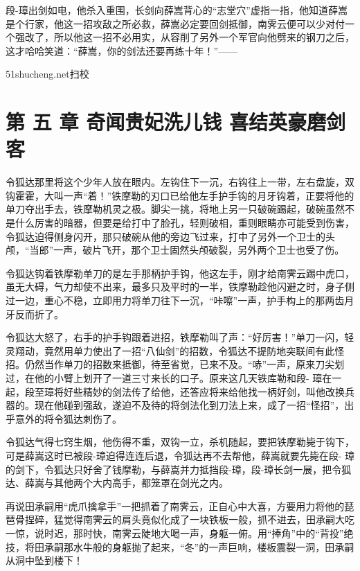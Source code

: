\documentclass[12pt,oneside]{book}
\begin{document}
段-璋出剑如电，他杀入重围，长剑向薛嵩背心的``志堂穴''虚指一指，他知道薛嵩是个行家，他这一招攻敌之所必救，薛嵩必定要回剑抵御，南霁云便可以少对付一个强改了，所以他这一招不必用实，从容削了另外一个军官向他劈来的钢刀之后，这才哈哈笑道：``薛嵩，你的剑法还要再练十年！''------

51shucheng.net扫校

\chapter{第 五 章 奇闻贵妃洗儿钱
喜结英豪磨剑客}\label{ux7b2c-ux4e94-ux7ae0-ux5947ux95fbux8d35ux5983ux6d17ux513fux94b1-ux559cux7ed3ux82f1ux8c6aux78e8ux5251ux5ba2}

令狐达那里将这个少年人放在眼内。左钩住下一沉，右钩往上一带，左右盘旋，双钩霍霍，大叫一声``着！''铁摩勒的刃口已给他左手护手钩的月牙钩着，正要将他的单刀夺出手去，铁摩勒机灵之极。脚尖一挑，将地上另一只破碗踢起，破碗虽然不是什么厉害的暗器，但要是给打中了脸孔，轻则破相，重则眼睛亦可能受到伤害，令狐达迫得侧身闪开，那只破碗从他的旁边飞过来，打中了另外一个卫士的头颅，``当郎''一声，破片飞开，那个卫士固然头颅破裂，另外两个卫士也受了伤。

令狐达钩着铁摩勒单刀的是左手那柄护手钩，他这左手，刚才给南霁云踢中虎口，虽无大碍，气力却使不出来，最多只及平时的一半，铁摩勒趁他闪避之时，身子侧过一边，重心不稳，立即用力将单刀往下一沉，``咔嚓''一声，护手构上的那两齿月牙反而折了。

令狐达大怒了，右手的护手钩跟着进招，铁摩勒叫了声：``好厉害！''单刀一闪，轻灵翔动，竟然用单力使出了一招``八仙剑''的招数，令狐达不提防地突联间有此怪招。仍然当作单刀的招数来抵御，待至省觉，已来不及。``哧''一声，原来刀尖划过，在他的小臂上划开了一道三寸来长的口子。原来这几天铁库勒和段-
璋在一起，段至璋将好些精妙的剑法传了给他，还答应将来给他找一柄好剑，叫他改换兵器的。现在他碰到强敌，遂迫不及待的将剑法化到刀法上来，成了一招``怪招''，出乎意外的将令狐达刺伤了。

令狐达气得七窍生烟，他伤得不重，双钩一立，杀机随起，要把铁摩勒毙于钩下，可是薛嵩这时已被段-璋迫得连连后退，令狐达再不去帮他，薛嵩就要先毙在段-
璋的剑下，令狐达只好舍了钱摩勒，与薛嵩并力抵挡段-璋，段-璋长剑一展，把令狐达、薛嵩与其他两个大内高手，都笼罩在剑光之内。

再说田承嗣用``虎爪擒拿手''一把抓着了南霁云，正自心中大喜，方要用力将他的琵琶骨捏碎，猛觉得南霁云的肩头竟似化成了一块铁板一般，抓不进去，田承嗣大吃一惊，说时迟，那时快，南霁云陡地大喝一声，身躯一俯。用``捧角''中的``背投''绝技，将田承嗣那水牛般的身躯抛了起来，``冬''的一声巨响，楼板震裂一洞，田承嗣从洞中坠到楼下！
\end{document}
